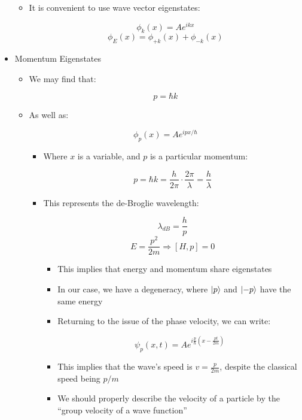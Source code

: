 \begin{itemize}
\begin{itemize}
      \item It is convenient to use wave vector eigenstates:

        $$\phi_k(x)=Ae^{ikx}$$
        $$\phi_E(x)=\phi_{+k}(x)+\phi_{-k}(x)$$

    \end{itemize}

  \item Momentum Eigenstates

    \begin{itemize}

      \item We may find that:

        $$p=\hbar k$$

      \item As well as:

        $$\phi_p(x)=Ae^{ipx/\hbar}$$

        \begin{itemize}

          \item Where $x$ is a variable, and $p$ is a particular momentum:

            $$p=\hbar k=\frac{h}{2\pi}\cdot\frac{2\pi}{\lambda}=\frac{h}{\lambda}$$

          \item This represents the de-Broglie wavelength:

            $$\lambda_{dB}=\frac{h}{p}$$
            $$E=\frac{p^2}{2m}\Rightarrow [H,p]=0$$

            \begin{itemize}

              \item This implies that energy and momentum share eigenstates

              \item In our case, we have a degeneracy, where $\ket{p}$ and $\ket{-p}$ have the same energy

              \item Returning to the issue of the phase velocity, we can write:

                $$\psi_p(x,t)=Ae^{i\frac{p}{\hbar}\left( x-\frac{pt}{2m} \right)}$$

              \item This implies that the wave's speed is $v=\frac{p}{2m}$, despite the classical speed being $p/m$

              \item We should properly describe the velocity of a particle by the ``group velocity of a wave function''


\end{itemize}
\end{itemize}
\end{itemize}
\end{itemize}
